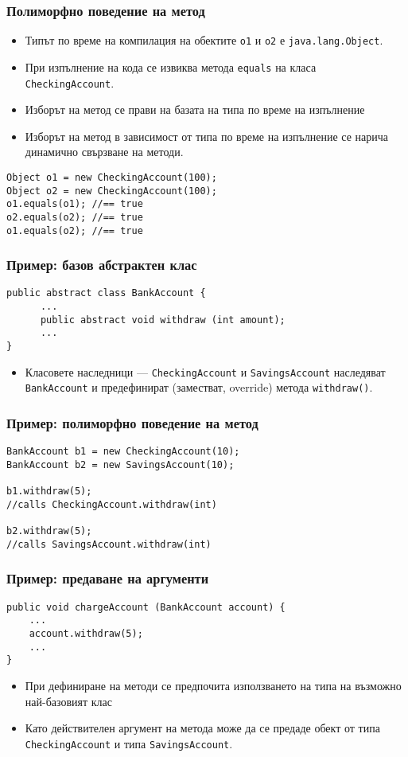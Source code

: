 \documentclass[ignorenonframetext, hyperref=unicode,compress]{beamer}
\begin{document}
\begin{frame}[containsverbatim]\frametitle{Полиморфно поведение на метод}
\begin{itemize}
 \item Типът по време на компилация на обектите \lstinline{o1} и \lstinline{o2} е \lstinline{java.lang.Object}.
 \item При изпълнение на кода се извиква метода \lstinline{equals} на класа \lstinline{CheckingAccount}.
 \item Изборът на метод се прави на базата на типа по време на изпълнение
 \item Изборът на метод в зависимост от типа по време на изпълнение се нарича динамично свързване на методи.
\end{itemize}
\begin{lstlisting}
Object o1 = new CheckingAccount(100);
Object o2 = new CheckingAccount(100);
o1.equals(o1); //== true
o2.equals(o2); //== true
o1.equals(o2); //== true
\end{lstlisting}
\end{frame}

\begin{frame}[containsverbatim]\frametitle{Пример: базов абстрактен клас}
\begin{lstlisting}
public abstract class BankAccount {
      ...
      public abstract void withdraw (int amount);
      ...
}
\end{lstlisting}
\begin{itemize}
 \item Класовете наследници --- \lstinline{CheckingAccount} и \lstinline{SavingsAccount} наследяват \lstinline{BankAccount} и предефинират (заместват, override) метода \lstinline{withdraw()}.
\end{itemize}
\end{frame}

\begin{frame}[containsverbatim]\frametitle{Пример: полиморфно поведение на метод}
\begin{lstlisting}
BankAccount b1 = new CheckingAccount(10);
BankAccount b2 = new SavingsAccount(10);

b1.withdraw(5);
//calls CheckingAccount.withdraw(int)

b2.withdraw(5);
//calls SavingsAccount.withdraw(int)
\end{lstlisting}
\end{frame}

\begin{frame}[containsverbatim]\frametitle{Пример: предаване на аргументи}
\begin{lstlisting}
public void chargeAccount (BankAccount account) {
	...
	account.withdraw(5);
	...
}
\end{lstlisting}
\begin{itemize}
 \item При дефиниране на методи се предпочита използването на типа на възможно най-базовият клас
 \item Като действителен аргумент на метода може да се предаде обект от типа \lstinline{CheckingAccount} и типа \lstinline{SavingsAccount}.
\end{itemize}
\end{frame}
\end{document}
